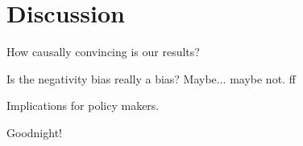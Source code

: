 \documentclass[12pt,a4paper]{article}
\begin{document}





\section{Discussion}

How causally convincing is our results?

Is the negativity bias really a bias? Maybe... maybe not.  ff

Implications for policy makers.

Goodnight!








\clearpage

\singlespacing



\end{document}
